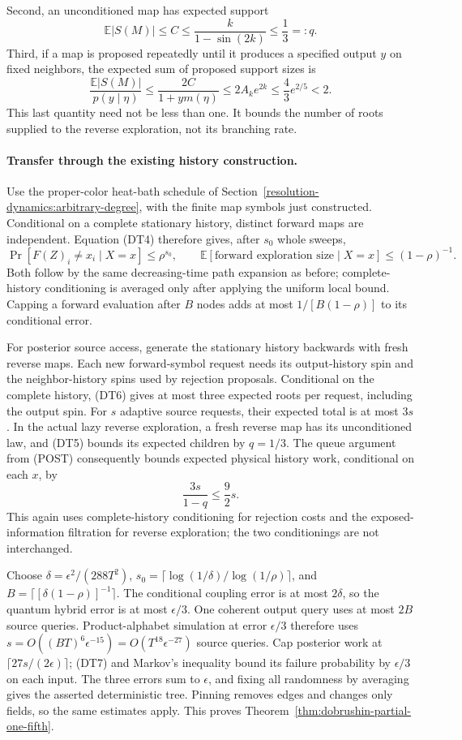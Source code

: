 Second, an unconditioned map has expected support
\[
 \mathbb E|S(M)|\le C
 \le\frac{k}{1-\sin(2k)}\le\frac13=:q.              \tag{DT5}
\]
Third, if a map is proposed repeatedly until it produces a specified
output $y$ on fixed neighbors, the expected sum of proposed support
sizes is
\[
 \frac{\mathbb E|S(M)|}{p(y\mid\eta)}
 \le\frac{2C}{1+y m(\eta)}
 \le2 A_ke^{2k}\le\frac43e^{2/5}<2.                \tag{DT6}
\]
This last quantity need not be less than one. It bounds the number
of roots supplied to the reverse exploration, not its branching rate.

\paragraph{Transfer through the existing history construction.}
Use the proper-color heat-bath schedule of
Section~\ref{resolution-dynamics:arbitrary-degree}, with the finite
map symbols just constructed. Conditional on a complete stationary
history, distinct forward maps are independent. Equation (DT4)
therefore gives, after $s_0$ whole sweeps,
\[
 \Pr[F(Z)_i\ne x_i\mid X=x]\le\rho^{s_0},\qquad
 \mathbb E[\text{forward exploration size}\mid X=x]
 \le(1-\rho)^{-1}.
\]
Both follow by the same decreasing-time path expansion as before;
complete-history conditioning is averaged only after applying the
uniform local bound. Capping a forward evaluation after $B$ nodes
adds at most $1/[B(1-\rho)]$ to its conditional error.

For posterior source access, generate the stationary history backwards
with fresh reverse maps. Each new forward-symbol request needs its
output-history spin and the neighbor-history spins used by rejection
proposals. Conditional on the complete history, (DT6) gives at most
three expected roots per request, including the output spin. For
$s$ adaptive source requests, their expected total is at most $3s$.
In the actual lazy reverse exploration, a fresh reverse map has its
unconditioned law, and (DT5) bounds its expected children by $q=1/3$.
The queue argument from (POST) consequently bounds expected physical
history work, conditional on each $x$, by
\[
 \frac{3s}{1-q}\le\frac92s.                         \tag{DT7}
\]
This again uses complete-history conditioning for rejection costs
and the exposed-information filtration for reverse exploration;
the two conditionings are not interchanged.

Choose $\delta=\epsilon^2/(288T^2)$,
$s_0=\lceil\log(1/\delta)/\log(1/\rho)\rceil$, and
$B=\lceil[\delta(1-\rho)]^{-1}\rceil$.
The conditional coupling error is at most $2\delta$, so the quantum
hybrid error is at most $\epsilon/3$. One coherent output query
uses at most $2B$ source queries. Product-alphabet simulation at error
$\epsilon/3$ therefore uses
$s=O((BT)^6\epsilon^{-15})=O(T^{18}\epsilon^{-27})$
source queries. Cap posterior work at
$\lceil27s/(2\epsilon)\rceil$; (DT7) and Markov's inequality bound
its failure probability by $\epsilon/3$ on each input. The three
errors sum to $\epsilon$, and fixing all randomness by averaging
gives the asserted deterministic tree. Pinning removes edges and
changes only fields, so the same estimates apply. This proves
Theorem~\ref{thm:dobrushin-partial-one-fifth}.

